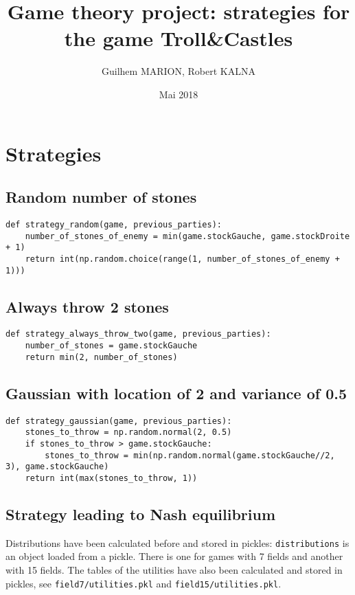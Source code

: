 \documentclass{article}%
\begin{document}
%
\author{Guilhem MARION, Robert KALNA}
\title{Game theory project: strategies for the game Troll\&Castles}
\date{Mai 2018}
\maketitle
\normalsize%
\section{Strategies}

\subsection{Random number of stones}

\begin{verbatim}
def strategy_random(game, previous_parties):
	number_of_stones_of_enemy = min(game.stockGauche, game.stockDroite + 1)
	return int(np.random.choice(range(1, number_of_stones_of_enemy + 1)))
\end{verbatim}

\subsection{Always throw 2 stones}

\begin{verbatim}
def strategy_always_throw_two(game, previous_parties):
	number_of_stones = game.stockGauche
	return min(2, number_of_stones)
\end{verbatim}

\subsection{Gaussian with location of 2 and variance of 0.5}

\begin{verbatim}
def strategy_gaussian(game, previous_parties):
	stones_to_throw = np.random.normal(2, 0.5)
	if stones_to_throw > game.stockGauche:
		stones_to_throw = min(np.random.normal(game.stockGauche//2, 3), game.stockGauche)
	return int(max(stones_to_throw, 1))
\end{verbatim}

\subsection{Strategy leading to Nash equilibrium}

Distributions have been calculated before and stored in pickles: \texttt{distributions} is an object loaded from a pickle. There is one for games with 7 fields and another with 15 fields. The tables of the utilities have also been calculated and stored in pickles, see \texttt{field7/utilities.pkl} and \texttt{field15/utilities.pkl}.
\end{document}
